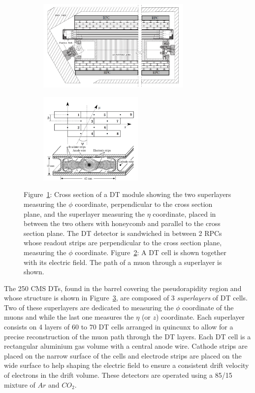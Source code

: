 	\begin{figure}[H]
		\begin{subfigure}{0.6\linewidth}
			\centering
			\includegraphics[height = 4.5cm]{fig/chapt2/DT_layout.png}
			\caption{\label{fig:DT:A}}
		\end{subfigure}
		\begin{subfigure}{0.4\linewidth}
			\centering
			\includegraphics[height = 4.5cm]{fig/chapt2/DT_cells.png}
			\caption{\label{fig:DT:B}}
		\end{subfigure}
		\caption{\label{fig:DT} Figure~\ref{fig:DT:A}: Cross section of a DT module showing the two superlayers measuring the $\phi$ coordinate, perpendicular to the cross section plane, and the superlayer measuring the $\eta$ coordinate, placed in between the two others with honeycomb and parallel to the cross section plane. The DT detector is sandwiched in between 2 RPCs whose readout strips are perpendicular to the cross section plane, measuring the $\phi$ coordinate. Figure~\ref{fig:DT:B}: A DT cell is shown together with its electric field. The path of a muon through a superlayer is shown.}
	\end{figure}
	
	The 250 CMS DTs, found in the barrel covering the pseudorapidity region  and whose structure is shown in Figure~\ref{fig:DT}, are composed of 3 \textit{superlayers} of DT cells. Two of these superlayers are dedicated to measuring the $\phi$ coordinate of the muons and while the last one measures the $\eta$ (or $z$) coordinate. Each superlayer consists on 4 layers of 60 to 70 DT cells arranged in quincunx to allow for a precise reconstruction of the muon path through the DT layers. Each DT cell is a rectangular aluminium gas volume with a central anode wire. Cathode strips are placed on the narrow surface of the cells and electrode strips are placed on the wide surface to help shaping the electric field to ensure a consistent drift velocity of electrons in the drift volume. These detectors are operated using a 85/15 mixture of $Ar$ and $CO_2$.
	
